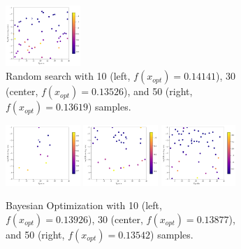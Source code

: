\begin{figure}[htbp!]
\begin{subfigure}{\textwidth}
		\includegraphics[width=0.31\textwidth]{figures/Results/First_comparison/Random50}
		\caption{ Random search with 10 (left, $f(x_{opt}) = 0.14141$), 30 (center, $f(x_{opt}) = 0.13526$), and 50 (right, $f(x_{opt}) = 0.13619$) samples. }
		\label{fig:first_comparison_random_search}
	\end{subfigure}
	\begin{subfigure}{\textwidth}
		\centering
		\includegraphics[width=0.31\textwidth]{figures/Results/First_comparison/Bayesian10}
		\includegraphics[width=0.31\textwidth]{figures/Results/First_comparison/Bayesian30}
		\includegraphics[width=0.31\textwidth]{figures/Results/First_comparison/Bayesian50}
		\caption{ Bayesian Optimization with 10 (left, $f(x_{opt}) = 0.13926$), 30 (center, $f(x_{opt}) = 0.13877$), and 50 (right, $f(x_{opt}) = 0.13542$) samples. }
		\label{fig:first_comparison_bayesian_optimization}
	\end{subfigure}
	\begin{subfigure}{\textwidth}

\end{subfigure}
\end{figure}
